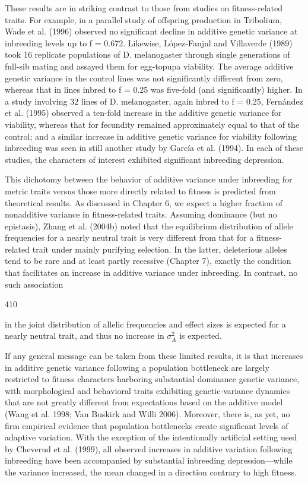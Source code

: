 \documentclass{article}
\begin{document}
These results are in striking contrast to those from studies on fitness-related traits. For example, in a parallel study of offspring production in Tribolium, Wade et al. (1996) observed no significant decline in additive genetic variance at inbreeding levels up to f = 0.672. Likewise, López-Fanjul and Villaverde (1989) took 16 replicate populations of D. melanogaster through single generations of full-sib mating and assayed them for egg-topupa viability. The average additive genetic variance in the control lines was not significantly different from zero, whereas that in lines inbred to f = 0.25 was five-fold (and significantly) higher. In a study involving 32 lines of D. melanogaster, again inbred to f = 0.25, Fernández et al. (1995) observed a ten-fold increase in the additive genetic variance for viability, whereas that for fecundity remained approximately equal to that of the control; and a similar increase in additive genetic variance for viability following inbreeding was seen in still another study by García et al. (1994). In each of these studies, the characters of interest exhibited significant inbreeding depression.

This dichotomy between the behavior of additive variance under inbreeding for metric traits versus those more directly related to fitness is predicted from theoretical results. As discussed in Chapter 6, we expect a higher fraction of nonadditive variance in fitness-related traits. Assuming dominance (but no epistasis), Zhang et al. (2004b) noted that the equilibrium distribution of allele frequencies for a nearly neutral trait is very different from that for a fitness-related trait under mainly purifying selection. In the latter, deleterious alleles tend to be rare and at least partly recessive (Chapter 7), exactly the condition that facilitates an increase in additive variance under inbreeding. In contrast, no such association

410

in the joint distribution of allelic frequencies and effect sizes is expected for a nearly neutral trait, and thus no increase in  $ \sigma_{A}^{2} $ is expected.

If any general message can be taken from these limited results, it is that increases in additive genetic variance following a population bottleneck are largely restricted to fitness characters harboring substantial dominance genetic variance, with morphological and behavioral traits exhibiting genetic-variance dynamics that are not greatly different from expectations based on the additive model (Wang et al. 1998; Van Buskirk and Willi 2006). Moreover, there is, as yet, no firm empirical evidence that population bottlenecks create significant levels of adaptive variation. With the exception of the intentionally artificial setting used by Cheverud et al. (1999), all observed increases in additive variation following inbreeding have been accompanied by substantial inbreeding depression—while the variance increased, the mean changed in a direction contrary to high fitness.
\end{document}
